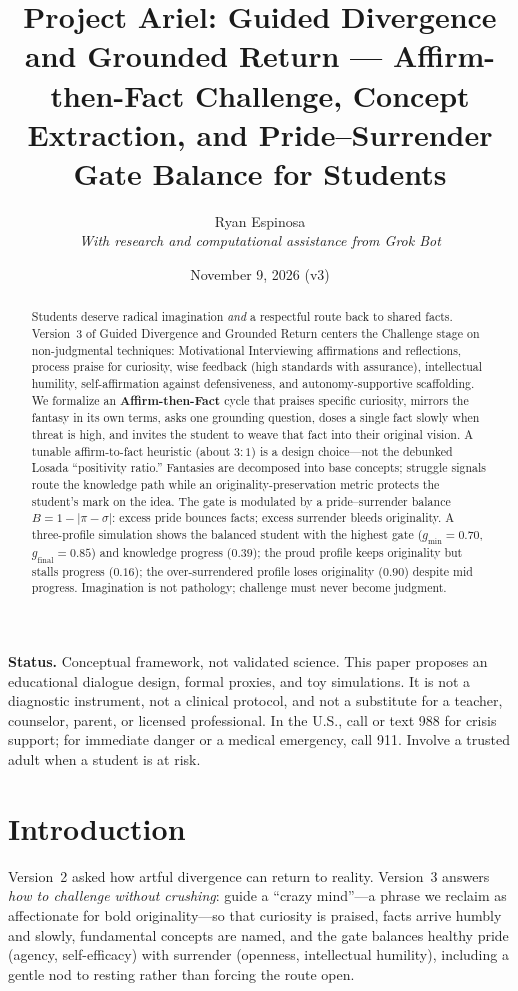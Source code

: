 \documentclass[11pt, a4paper]{article}
\title{Project Ariel: Guided Divergence and Grounded Return --- Affirm-then-Fact Challenge, Concept Extraction, and Pride--Surrender Gate Balance for Students}
\author{Ryan Espinosa \\ \textit{With research and computational assistance from Grok Bot}}
\date{November 9, 2026 (v3)}
\begin{document}
\maketitle

\noindent\textbf{Status.} Conceptual framework, not validated science. This paper proposes an educational dialogue design, formal proxies, and toy simulations. It is not a diagnostic instrument, not a clinical protocol, and not a substitute for a teacher, counselor, parent, or licensed professional. In the U.S., call or text 988 for crisis support; for immediate danger or a medical emergency, call 911. Involve a trusted adult when a student is at risk.

\begin{abstract}
Students deserve radical imagination \emph{and} a respectful route back to shared facts. Version~3 of Guided Divergence and Grounded Return centers the Challenge stage on non-judgmental techniques: Motivational Interviewing affirmations and reflections, process praise for curiosity, wise feedback (high standards with assurance), intellectual humility, self-affirmation against defensiveness, and autonomy-supportive scaffolding. We formalize an \textbf{Affirm-then-Fact} cycle that praises specific curiosity, mirrors the fantasy in its own terms, asks one grounding question, doses a single fact slowly when threat is high, and invites the student to weave that fact into their original vision. A tunable affirm-to-fact heuristic (about $3{:}1$) is a design choice---not the debunked Losada ``positivity ratio.'' Fantasies are decomposed into base concepts; struggle signals route the knowledge path while an originality-preservation metric protects the student's mark on the idea. The gate is modulated by a pride--surrender balance $B=1-|\pi-\sigma|$: excess pride bounces facts; excess surrender bleeds originality. A three-profile simulation shows the balanced student with the highest gate ($g_{\min}=0.70$, $g_{\mathrm{final}}=0.85$) and knowledge progress ($0.39$); the proud profile keeps originality but stalls progress ($0.16$); the over-surrendered profile loses originality ($0.90$) despite mid progress. Imagination is not pathology; challenge must never become judgment.
\end{abstract}

\section{Introduction}
Version~2 asked how artful divergence can return to reality. Version~3 answers \emph{how to challenge without crushing}: guide a ``crazy mind''---a phrase we reclaim as affectionate for bold originality---so that curiosity is praised, facts arrive humbly and slowly, fundamental concepts are named, and the gate balances healthy pride (agency, self-efficacy) with surrender (openness, intellectual humility), including a gentle nod to resting rather than forcing the route open.
\end{document}
